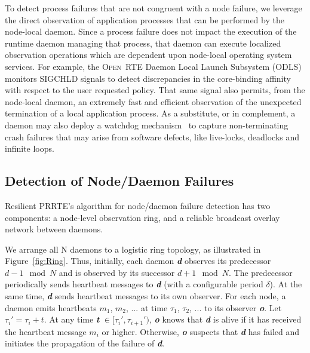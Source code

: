 \documentclass[5p,times,twocolumn]{elsarticle}
\newcommand{\prrte}[0]{\textsc{PRRTE}\xspace}
\newcommand{\orte}[0]{\textsc{Open~RTE}\xspace}
\begin{document}
To detect process failures that are not congruent with a node failure, we
leverage the direct observation of application processes that can be
performed by the node-local daemon. Since a process failure does not
impact the execution of the runtime daemon managing that process, that
daemon can execute localized observation operations which are dependent
upon node-local operating system services. For example, the \orte Daemon
Local Launch Subsystem (ODLS) monitors SIGCHLD signals to detect discrepancies
in the core-binding affinity with respect to the user requested policy.
That same signal also permits, from the node-local daemon, an extremely fast and efficient observation
of the unexpected termination of a local application process. As a substitute,
or in complement, a daemon may also deploy a watchdog mechanism~\cite{CASTAIN18}
to capture non-terminating crash failures that may arise from software
defects, like live-locks, deadlocks and infinite loops.

\subsection{Detection of Node/Daemon Failures}

Resilient \prrte's algorithm for node/daemon failure detection has two
components: a node-level observation ring, and a reliable broadcast overlay network between daemons.

We arrange all N daemons to a logistic ring topology, as illustrated in Figure~\ref{fig:Ring}.
Thus, initially, each daemon \textbf{\textit{d}} observes its predecessor $d-1 \mod{N}$ and is observed by
its successor $d+1 \mod{N}$. The predecessor periodically sends heartbeat messages to \textbf{\textit{d}} (with a
configurable period $\delta$). At the same time, \textbf{\textit{d}} sends heartbeat messages to its own observer. For each node, a daemon emits heartbeats $m_1$, $m_2$, ... at time $\tau_1$, $\tau_2$, ... to its observer \textbf{\textit{o}}. Let $\tau_i' = \tau_i + t$. At any time \textbf{\textit{t}} $\in [\tau_i', \tau_{i+1}')$, \textbf{\textit{o}} knows that \textbf{\textit{d}} is alive if it has received the
heartbeat message $m_i$ or higher. Otherwise, \textbf{\textit{o}} suspects that \textbf{\textit{d}} has failed and initiates the propagation of the
failure of \textbf{\textit{d}}.
\end{document}
